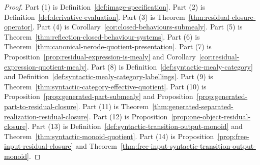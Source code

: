 \begin{proof}
Part (1) is Definition~\ref{def:image-specification}. Part (2) is
Definition~\ref{def:derivative-evaluation}. Part (3) is
Theorem~\ref{thm:residual-closure-operator}. Part (4) is
Corollary~\ref{cor:closed-behaviours-submealy}. Part (5) is
Theorem~\ref{thm:reflection-closed-behaviour-systems}. Part (6) is
Theorem~\ref{thm:canonical-nerode-quotient-presentation}. Part (7) is
Proposition~\ref{prop:residual-expression-is-mealy} and
Corollary~\ref{cor:residual-expression-quotient-mealy}. Part (8) is
Definition~\ref{def:syntactic-mealy-category} and
Definition~\ref{def:syntactic-mealy-category-labellings}. Part (9) is
Theorem~\ref{thm:syntactic-category-effective-quotient}. Part (10) is
Proposition~\ref{prop:generated-part-submealy} and
Proposition~\ref{prop:generated-part-to-residual-closure}. Part (11) is
Theorem~\ref{thm:generated-separated-realization-residual-closure}. Part
(12) is Proposition~\ref{prop:one-object-residual-closure}. Part (13) is
Definition~\ref{def:syntactic-transition-output-monoid} and
Theorem~\ref{thm:syntactic-monoid-quotient}. Part (14) is
Proposition~\ref{prop:free-input-residual-closure} and
Theorem~\ref{thm:free-input-syntactic-transition-output-monoid}.
\end{proof}